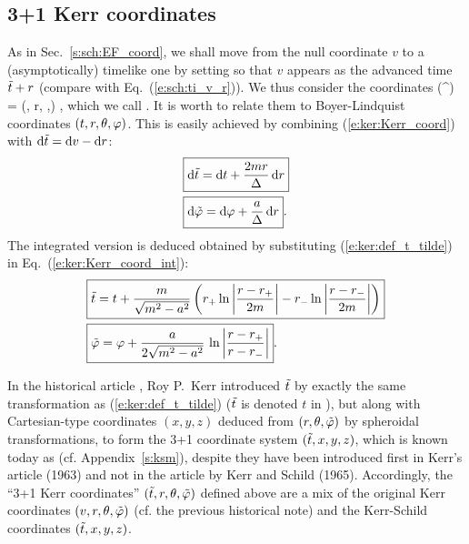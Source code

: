 \subsection{3+1 Kerr coordinates} \label{s:ker:3p1_Kerr_coord}

As in Sec.~\ref{s:sch:EF_coord},
we shall move from the null coordinate $v$ to a (asymptotically)
timelike one by setting
\be \label{e:ker:def_t_tilde}
     \iff {}
\ee
so that $v$ appears as the advanced time ${\tilde t}+r$ (compare with Eq.~(\ref{e:sch:ti_v_r})). We thus consider
the coordinates
\be
    (^\alpha) = (\ti, r, \th,\tph) ,
\ee
which we call
.
It is worth to relate them to Boyer-Lindquist coordinates
$(t,r,\theta,\varphi)$. This is easily achieved
by combining (\ref{e:ker:Kerr_coord}) with $\mathrm{d}{\tilde t} = \mathrm{d} v - \mathrm{d} r$:
\begin{subequations}
\label{e:ker:Kerr_3p1_BL}
\begin{align}
& \fbox{$\displaystyle \mathrm{d} {\tilde t} = \mathrm{d} t + \frac{2m r}{\Delta} \, \mathrm{d} r$} \\
& \fbox{$\displaystyle \mathrm{d} {\tilde\varphi} = \mathrm{d} \varphi + \frac{a}{\Delta}\, \mathrm{d} r$} .
\end{align}
\end{subequations}
The integrated version is deduced obtained by substituting (\ref{e:ker:def_t_tilde}) in
Eq.~(\ref{e:ker:Kerr_coord_int}):
\begin{subequations}
\label{e:ker:Kerr_3p1_BL_int}
\begin{align}
& \fbox{$\displaystyle {\tilde t} = t  + \frac{m}{\sqrt{m^2-a^2}} \left(
    r_+ \ln\left| \frac{r-r_+}{2m} \right|
    - r_- \ln\left| \frac{r-r_-}{2m} \right| \right) $} \label{e:ker:ti_t}\\
& \fbox{$\displaystyle  {\tilde\varphi} = \varphi + \frac{a}{2\sqrt{m^2-a^2}}\, \ln \left|
    \frac{r-r_+}{r-r_-} \right| $} .
\end{align}
\end{subequations}


\begin{hist}
In the historical article \cite{Kerr63}, Roy P.~Kerr introduced ${\tilde t}$ by exactly
the same transformation as (\ref{e:ker:def_t_tilde}) (${\tilde t}$ is denoted $t$
in \cite{Kerr63}), but along with Cartesian-type coordinates $(x,y,z)$
deduced from $(r,\theta,{\tilde\varphi})$ by spheroidal transformations, to form the 3+1
coordinate system $({\tilde t},x,y,z)$, which is known today as
 (cf. Appendix~\ref{s:ksm}),
despite
they have been introduced first in Kerr's article \cite{Kerr63} (1963) and not
in the article by Kerr and Schild \cite{KerrS65} (1965). Accordingly,
the ``3+1 Kerr coordinates'' $({\tilde t}, r, \theta,{\tilde\varphi})$ defined above
are a mix of the original Kerr coordinates
$(v,r,\theta,{\tilde\varphi})$ (cf. the previous historical note)
and the Kerr-Schild coordinates $({\tilde t},x,y,z)$.
\end{hist}

